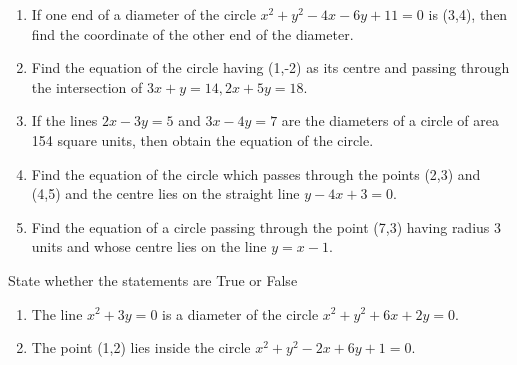 \begin{enumerate}[label=\thesubsection.\arabic*,ref=\thesubsection.\theenumi,resume*]
 \item If one end of a diameter of the circle $x^2+y^2-4x-6y+11 =0$ is (3,4), then find the coordinate of the other end of the diameter.
 \item Find the equation of the circle having (1,-2) as its centre  and passing through the intersection of $3x+y=14, 2x+5y=18$.
\item If the lines $2x-3y=5$ and $3x-4y=7$ are the diameters of a circle of area 154 square units, then obtain the equation of the circle.
\item Find the equation of the circle which passes through the points (2,3) and (4,5) and the centre lies on the straight line $y-4x+3=0$.
\item Find the equation of a circle passing through the point (7,3) having radius 3 units and whose centre lies on the line $y=x-1$.
\end{enumerate}
State whether the statements are True or False 
\begin{enumerate}[label=\thesubsection.\arabic*,ref=\thesubsection.\theenumi,resume*]
\item The line $x^2+3y=0$ is a diameter of the circle $x^2+y^2+6x+2y=0$.
\item The point (1,2) lies inside the circle $x^2+y^2-2x+6y+1=0$.
\end{enumerate}
